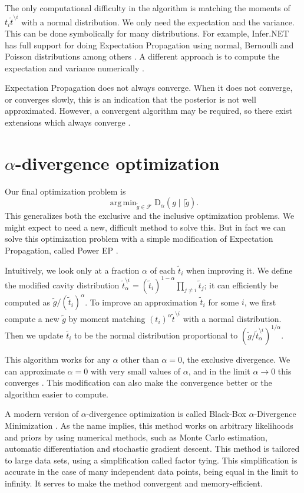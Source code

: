 \documentclass[12pt,vu]{adammath}
\newcommand\D[3]{{\text{D}_{#1}({#2} \mid\mid {#3})}}
\newcommand\Da[2]{\D{\alpha}{#1}{#2}}
\DeclareMathOperator*{\argmin}{arg\,min}
\theoremstyle{plain}
\theoremstyle{definition}
\theoremstyle{remark}
\begin{document}
The only computational difficulty in the algorithm is matching the moments of $t_i \tilde{t}^{\setminus i}$ with a normal distribution.
We only need the expectation and the variance.
This can be done symbolically for many distributions.
For example, Infer.NET has full support for doing Expectation Propagation using normal, Bernoulli and Poisson distributions among others \cite{infernet}.
A different approach is to compute the expectation and variance numerically \cite{bbalpha}.

Expectation Propagation does not always converge.
When it does not converge, or converges slowly, this is an indication that the posterior is not well approximated.
However, a convergent algorithm may be required, so there exist extensions which always converge \cite{bbalpha}.

\section{$\alpha$-divergence optimization}\label{powerep}
Our final optimization problem is
$$\argmin_{\tilde{g} \in \mathcal{F}} \Da{g}{\tilde{g}}.$$
This generalizes both the exclusive and the inclusive optimization problems.
We might expect to need a new, difficult method to solve this.
But in fact we can solve this optimization problem with a simple modification of Expectation Propagation, called Power EP \cite{minkapowerep}.

Intuitively, we look only at a fraction $\alpha$ of each $\tilde{t}_i$ when improving it.
We define the modified cavity distribution $\tilde{t}_\alpha^{\setminus i} = (\tilde{t}_i)^{1-\alpha} \prod_{j \ne i} \tilde{t}_j$; it can efficiently be computed as $\tilde{g} / (\tilde{t}_i)^\alpha$.
To improve an approximation $\tilde{t}_i$ for some $i$, we first compute a new $\tilde{g}$ by moment matching $(t_i)^\alpha \tilde{t}^{\setminus i}$ with a normal distribution.
Then we update $\tilde{t_i}$ to be the normal distribution proportional to $(\tilde{g} / \tilde{t}_\alpha^{\setminus i})^{1/\alpha}$.

This algorithm works for any $\alpha$ other than $\alpha = 0$, the exclusive divergence.
We can approximate $\alpha = 0$ with very small values of $\alpha$, and in the limit $\alpha \to 0$ this converges \cite{bbalpha}.
This modification can also make the convergence better or the algorithm easier to compute.

A modern version of $\alpha$-divergence optimization is called Black-Box $\alpha$-Divergence Minimization \cite{bbalpha}.
As the name implies, this method works on arbitrary likelihoods and priors by using numerical methods, such as Monte Carlo estimation, automatic differentiation and stochastic gradient descent.
This method is tailored to large data sets, using a simplification called factor tying.
This simplification is accurate in the case of many independent data points, being equal in the limit to infinity.
It serves to make the method convergent and memory-efficient.
\end{document}
